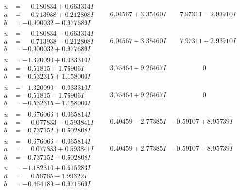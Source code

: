 \documentclass[1p]{elsarticle_modified}
\theoremstyle{definition}
\begin{document}
$$\begin{array}{c|c|c}
\begin{aligned}
u &= \phantom{-}0.180834 + 0.663314 I \\
a &= \phantom{-}0.713938 + 0.212808 I \\
b &= -0.900032 - 0.977689 I\end{aligned}
 & \phantom{-}6.04567 + 3.35460 I & \phantom{-}7.97311 - 2.93910 I \\ \hline\begin{aligned}
u &= \phantom{-}0.180834 - 0.663314 I \\
a &= \phantom{-}0.713938 - 0.212808 I \\
b &= -0.900032 + 0.977689 I\end{aligned}
 & \phantom{-}6.04567 - 3.35460 I & \phantom{-}7.97311 + 2.93910 I \\ \hline\begin{aligned}
u &= -1.320090 + 0.033310 I \\
a &= -0.51815 + 1.76906 I \\
b &= -0.532315 + 1.158000 I\end{aligned}
 & \phantom{-}3.75464 - 9.26467 I & \phantom{-0.000000 } 0 \\ \hline\begin{aligned}
u &= -1.320090 - 0.033310 I \\
a &= -0.51815 - 1.76906 I \\
b &= -0.532315 - 1.158000 I\end{aligned}
 & \phantom{-}3.75464 + 9.26467 I & \phantom{-0.000000 } 0 \\ \hline\begin{aligned}
u &= -0.676066 + 0.065814 I \\
a &= \phantom{-}0.077833 - 0.593841 I \\
b &= -0.737152 + 0.602808 I\end{aligned}
 & \phantom{-}0.40459 - 2.77385 I & -0.59107 + 8.95739 I \\ \hline\begin{aligned}
u &= -0.676066 - 0.065814 I \\
a &= \phantom{-}0.077833 + 0.593841 I \\
b &= -0.737152 - 0.602808 I\end{aligned}
 & \phantom{-}0.40459 + 2.77385 I & -0.59107 - 8.95739 I \\ \hline\begin{aligned}
u &= -1.182310 + 0.615283 I \\
a &= \phantom{-}0.56765 - 1.99322 I \\
b &= -0.464189 - 0.971569 I\end{aligned}

\end{array}$$
\end{document}
